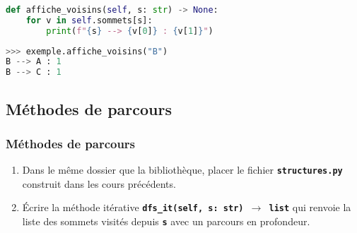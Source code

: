 \documentclass[svgnames,11pt]{beamer}
\begin{document}
\begin{frame}[fragile]
    \frametitle{}

\begin{center}
\begin{lstlisting}[language=Python , basicstyle=\ttfamily\small, xleftmargin=2em, xrightmargin=2em]
def affiche_voisins(self, s: str) -> None:
    for v in self.sommets[s]:
        print(f"{s} --> {v[0]} : {v[1]}")
\end{lstlisting}
\begin{lstlisting}[language=Python , basicstyle=\ttfamily\small, xleftmargin=2em, xrightmargin=2em]
>>> exemple.affiche_voisins("B")
B --> A : 1
B --> C : 1
\end{lstlisting}
\end{center}

\end{frame}
\subsection{Méthodes de parcours}
\begin{frame}
    \frametitle{Méthodes de parcours}
\begin{activite}
\begin{enumerate}
    \item Dans le même dossier que la bibliothèque, placer le fichier \textbf{\texttt{structures.py}} construit dans les cours précédents.
    \item Écrire la méthode itérative \textbf{\texttt{dfs\_it(self, s: str) $\rightarrow$ list}} qui renvoie la liste des sommets visités depuis \textbf{\texttt{s}} avec un parcours en profondeur.
\end{enumerate}
\end{activite}
    

\end{frame}
\end{document}
